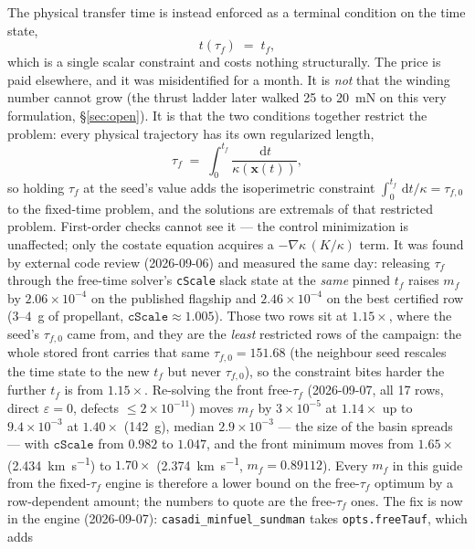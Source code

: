 \documentclass[11pt]{article}
\newcommand{\ud}{\,\mathrm{d}}
\newcommand{\vect}[1]{\bm{#1}}
\begin{document}
The physical transfer time is instead enforced as a terminal condition on the
time state,
\begin{equation}
t(\tau_f) \;=\; t_f ,
\end{equation}
which is a single scalar constraint and costs nothing structurally. The price
is paid elsewhere, and it was misidentified for a month. It is \emph{not} that
the winding number cannot grow (the thrust ladder later walked 25 to
\SI{20}{\milli\newton} on this very formulation, \S\ref{sec:open}). It is
that the two conditions together restrict the problem: every physical
trajectory has its own regularized length,
\begin{equation}
\tau_f \;=\; \int_0^{t_f}\frac{\ud t}{\kappa(\vect{x}(t))} ,
\end{equation}
so holding $\tau_f$ at the seed's value adds the isoperimetric constraint
$\int_0^{t_f}\ud t/\kappa = \tau_{f,0}$ to the fixed-time problem, and the
solutions are extremals of that restricted problem. First-order checks cannot
see it --- the control minimization is unaffected; only the costate equation
acquires a $-\nabla\kappa\,(K/\kappa)$ term. It was found by external code
review (2026-09-06) and measured the same day: releasing $\tau_f$ through the
free-time solver's \texttt{cScale} slack state at the \emph{same} pinned $t_f$
raises $m_f$ by $2.06\times10^{-4}$ on the published flagship and
$2.46\times10^{-4}$ on the best certified row ($3$--$4$~g of propellant,
$\texttt{cScale}\approx1.005$). Those two rows sit at $1.15\times$, where the
seed's $\tau_{f,0}$ came from, and they are the \emph{least} restricted rows
of the campaign: the whole stored front carries that same
$\tau_{f,0}=151.68$ (the neighbour seed rescales the time state to the new
$t_f$ but never $\tau_{f,0}$), so the constraint bites harder the further
$t_f$ is from $1.15\times$. Re-solving the front free-$\tau_f$ (2026-09-07, all 17 rows, direct $\varepsilon=0$, defects $\le2\times10^{-11}$) moves
$m_f$ by $3\times10^{-5}$ at $1.14\times$ up to $9.4\times10^{-3}$ at
$1.40\times$ (\SI{142}{\gram}), median $2.9\times10^{-3}$ --- the size of
the basin spreads --- with $\texttt{cScale}$ from $0.982$ to $1.047$, and the
front minimum moves from $1.65\times$ (\SI{2.434}{\kilo\metre\per\second})
to $1.70\times$ (\SI{2.374}{\kilo\metre\per\second}, $m_f=0.89112$). Every
$m_f$ in this guide from the fixed-$\tau_f$ engine is therefore a lower bound
on the free-$\tau_f$ optimum by a row-dependent amount; the numbers to quote
are the free-$\tau_f$ ones. The fix is now in the engine (2026-09-07):
\texttt{casadi\_minfuel\_sundman} takes \texttt{opts.freeTauf}, which adds
\end{document}
